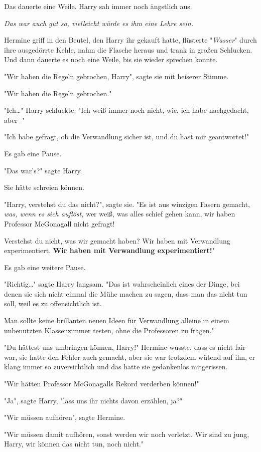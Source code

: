 {Das dauerte eine Weile. Harry sah immer noch ängstlich aus.

\emph{Das war auch gut so, vielleicht würde es ihm eine Lehre sein.}

Hermine griff in den Beutel, den Harry ihr gekauft hatte, flüsterte "\emph{Wasser}" durch ihre ausgedörrte Kehle, nahm die Flasche heraus und trank in großen Schlucken. Und dann dauerte es noch eine Weile, bis sie wieder sprechen konnte.

"Wir haben die Regeln gebrochen, Harry", sagte sie mit heiserer Stimme.

"Wir haben die Regeln gebrochen."

"Ich…" Harry schluckte. "Ich weiß immer noch nicht, wie, ich habe nachgedacht, aber -"

"Ich habe gefragt, ob die Verwandlung sicher ist, und du hast mir geantwortet!"

Es gab eine Pause.

"Das war's?" sagte Harry.

Sie hätte schreien können.

"Harry, verstehst du das nicht?", sagte sie. "Es ist aus winzigen Fasern gemacht, \emph{was, wenn es sich auflöst,} wer weiß, was alles schief gehen kann, wir haben Professor McGonagall nicht gefragt!

Verstehst du nicht, was wir gemacht haben? Wir haben mit Verwandlung experimentiert. \textbf{Wir haben mit Verwandlung experimentiert!}"

Es gab eine weitere Pause.

"Richtig…" sagte Harry langsam. "Das ist wahrscheinlich eines der Dinge, bei denen sie sich nicht einmal die Mühe machen zu sagen, dass man das nicht tun soll, weil es zu offensichtlich ist.

Man sollte keine brillanten neuen Ideen für Verwandlung alleine in einem unbenutzten Klassenzimmer testen, ohne die Professoren zu fragen."

"Du hättest uns umbringen können, Harry!" Hermine wusste, dass es nicht fair war, sie hatte den Fehler auch gemacht, aber sie war trotzdem wütend auf ihn, er klang immer so zuversichtlich und das hatte sie gedankenlos mitgerissen.

"Wir hätten Professor McGonagalls Rekord verderben können!"

"Ja", sagte Harry, "lass uns ihr nichts davon erzählen, ja?"

"Wir müssen aufhören", sagte Hermine.

"Wir müssen damit aufhören, sonst werden wir noch verletzt. Wir sind zu jung, Harry, wir können das nicht tun, noch nicht."

}

